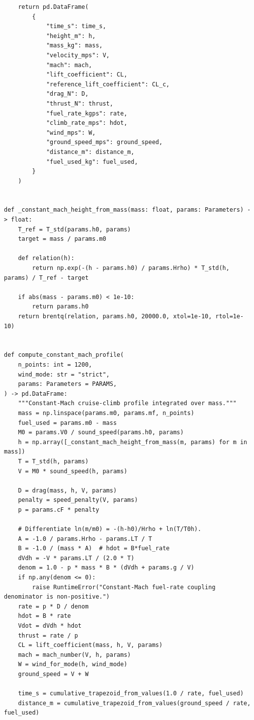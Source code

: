 \documentclass[UTF8]{ctexart}
\begin{document}
\begin{center}
\begin{lstlisting}
    return pd.DataFrame(
        {
            "time_s": time_s,
            "height_m": h,
            "mass_kg": mass,
            "velocity_mps": V,
            "mach": mach,
            "lift_coefficient": CL,
            "reference_lift_coefficient": CL_c,
            "drag_N": D,
            "thrust_N": thrust,
            "fuel_rate_kgps": rate,
            "climb_rate_mps": hdot,
            "wind_mps": W,
            "ground_speed_mps": ground_speed,
            "distance_m": distance_m,
            "fuel_used_kg": fuel_used,
        }
    )


def _constant_mach_height_from_mass(mass: float, params: Parameters) -> float:
    T_ref = T_std(params.h0, params)
    target = mass / params.m0

    def relation(h):
        return np.exp(-(h - params.h0) / params.Hrho) * T_std(h, params) / T_ref - target

    if abs(mass - params.m0) < 1e-10:
        return params.h0
    return brentq(relation, params.h0, 20000.0, xtol=1e-10, rtol=1e-10)


def compute_constant_mach_profile(
    n_points: int = 1200,
    wind_mode: str = "strict",
    params: Parameters = PARAMS,
) -> pd.DataFrame:
    """Constant-Mach cruise-climb profile integrated over mass."""
    mass = np.linspace(params.m0, params.mf, n_points)
    fuel_used = params.m0 - mass
    M0 = params.V0 / sound_speed(params.h0, params)
    h = np.array([_constant_mach_height_from_mass(m, params) for m in mass])
    T = T_std(h, params)
    V = M0 * sound_speed(h, params)

    D = drag(mass, h, V, params)
    penalty = speed_penalty(V, params)
    p = params.cF * penalty

    # Differentiate ln(m/m0) = -(h-h0)/Hrho + ln(T/T0h).
    A = -1.0 / params.Hrho - params.LT / T
    B = -1.0 / (mass * A)  # hdot = B*fuel_rate
    dVdh = -V * params.LT / (2.0 * T)
    denom = 1.0 - p * mass * B * (dVdh + params.g / V)
    if np.any(denom <= 0):
        raise RuntimeError("Constant-Mach fuel-rate coupling denominator is non-positive.")
    rate = p * D / denom
    hdot = B * rate
    Vdot = dVdh * hdot
    thrust = rate / p
    CL = lift_coefficient(mass, h, V, params)
    mach = mach_number(V, h, params)
    W = wind_for_mode(h, wind_mode)
    ground_speed = V + W

    time_s = cumulative_trapezoid_from_values(1.0 / rate, fuel_used)
    distance_m = cumulative_trapezoid_from_values(ground_speed / rate, fuel_used)


\end{lstlisting}
\end{center}
\end{document}
